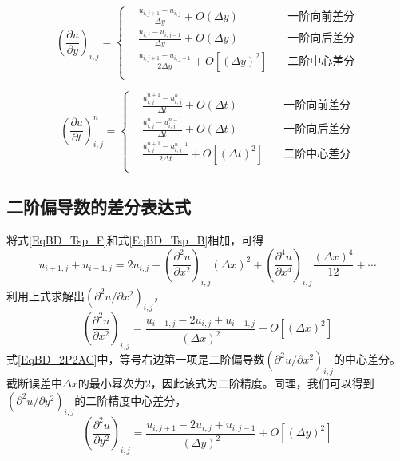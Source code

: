 \begin{equation}
  \left(
    \frac{\partial u}{\partial y}
  \right)_{i,j}
  =
  \left\{
    \begin{aligned}
      &\frac{u_{i,j+1}-u_{i,j}}{\Delta y} + O(\Delta y) & \mbox{一阶向前差分} \\
      &\frac{u_{i,j}-u_{i,j-1}}{\Delta y} + O(\Delta y) & \mbox{一阶向后差分} \\
      &\frac{u_{i,j+1}-u_{i,j-1}}{2\Delta y} + O[(\Delta y)^{2}] \quad& \mbox{二阶中心差分} \\
    \end{aligned}
  \right.
\end{equation}

\begin{equation}
  \left(
    \frac{\partial u}{\partial t}
  \right)_{i,j}^{n}
  =
  \left\{
    \begin{aligned}
      &\frac{u_{i,j}^{n+1}-u_{i,j}^{n}}{\Delta t} + O(\Delta t) & \mbox{一阶向前差分} \\
      &\frac{u_{i,j}^{n}-u_{i,j}^{n-1}}{\Delta t} + O(\Delta t) & \mbox{一阶向后差分} \\
      &\frac{u_{i,j}^{n+1}-u_{i,j}^{n-1}}{2\Delta t} + O[(\Delta t)^{2}] \quad& \mbox{二阶中心差分} \\
    \end{aligned}
  \right.
\end{equation}


\subsection{二阶偏导数的差分表达式}
将式\eqref{EqBD_Tsp_F}和式\eqref{EqBD_Tsp_B}相加，可得
\begin{equation}
  u_{i+1,j} + u_{i-1,j}
  =
  2u_{i,j}+
  \left(
    \frac{\partial^{2} u}{\partial x^{2}}
  \right)_{i,j}(\Delta x)^{2}
  +
  \left(
    \frac{\partial^{4} u}{\partial x^{4}}
  \right)_{i,j}\frac{(\Delta x)^{4}}{12}
  +
  \cdots
\end{equation}
利用上式求解出$(\partial^{2}u/\partial x^{2})_{i,j}$，
\begin{equation}
  \left(
    \frac{\partial^{2} u}{\partial x^{2}} 
  \right)_{i,j}
  =
  \frac{u_{i+1,j}-2u_{i,j}+u_{i-1,j}}{(\Delta x)^{2}}
  +
  O[(\Delta x)^{2}]
  \label{EqBD_2P2AC}
\end{equation}
式\eqref{EqBD_2P2AC}中，等号右边第一项是二阶偏导数$(\partial^{2}u/\partial x^{2})
_{i,j}$的中心差分。
截断误差中$\Delta x$的最小幂次为2，因此该式为二阶精度。同理，我们可以得到
$(\partial^{2}u/\partial y^{2})_{i,j}$的二阶精度中心差分，
\begin{equation}
  \left(
    \frac{\partial^{2} u}{\partial y^{2}} 
  \right)_{i,j}
  =
  \frac{u_{i,j+1}-2u_{i,j}+u_{i,j-1}}{(\Delta y)^{2}}
  +
  O[(\Delta y)^{2}]
  \label{EqBD_2Py2AC}
\end{equation}

